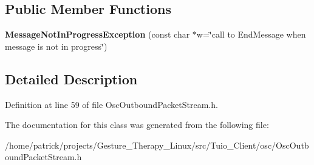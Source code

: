 \subsection*{Public Member Functions}
\begin{DoxyCompactItemize}
\item 
\mbox{\label{classosc_1_1_message_not_in_progress_exception_a25a572a3113273cb36d30bdb5b34715b}} 
{\bfseries Message\+Not\+In\+Progress\+Exception} (const char $\ast$w=\char`\"{}call to End\+Message when message is not in progress\char`\"{})
\end{DoxyCompactItemize}


\subsection{Detailed Description}


Definition at line 59 of file Osc\+Outbound\+Packet\+Stream.\+h.



The documentation for this class was generated from the following file\+:\begin{DoxyCompactItemize}
\item 
/home/patrick/projects/\+Gesture\+\_\+\+Therapy\+\_\+\+Linux/src/\+Tuio\+\_\+\+Client/osc/Osc\+Outbound\+Packet\+Stream.\+h\end{DoxyCompactItemize}

